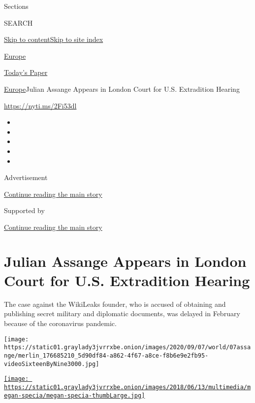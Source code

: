 Sections

SEARCH

\protect\hyperlink{site-content}{Skip to
content}\protect\hyperlink{site-index}{Skip to site index}

\href{https://www.nytimes3xbfgragh.onion/section/world/europe}{Europe}

\href{https://myaccount.nytimes3xbfgragh.onion/auth/login?response_type=cookie\&client_id=vi}{}

\href{https://www.nytimes3xbfgragh.onion/section/todayspaper}{Today's
Paper}

\href{/section/world/europe}{Europe}\textbar{}Julian Assange Appears in
London Court for U.S. Extradition Hearing

\url{https://nyti.ms/2Fi53dl}

\begin{itemize}
\item
\item
\item
\item
\item
\end{itemize}

Advertisement

\protect\hyperlink{after-top}{Continue reading the main story}

Supported by

\protect\hyperlink{after-sponsor}{Continue reading the main story}

\hypertarget{julian-assange-appears-in-london-court-for-us-extradition-hearing}{%
\section{Julian Assange Appears in London Court for U.S. Extradition
Hearing}\label{julian-assange-appears-in-london-court-for-us-extradition-hearing}}

The case against the WikiLeaks founder, who is accused of obtaining and
publishing secret military and diplomatic documents, was delayed in
February because of the coronavirus pandemic.

\texttt{[image: https://static01.graylady3jvrrxbe.onion/images/2020/09/07/world/07assange/merlin\_176685210\_5d90df84-a862-4f67-a8ce-f8b6e9e2fb95-videoSixteenByNine3000.jpg]}

\href{https://www.nytimes3xbfgragh.onion/by/megan-specia}{\texttt{[image: https://static01.graylady3jvrrxbe.onion/images/2018/06/13/multimedia/megan-specia/megan-specia-thumbLarge.jpg]}}

